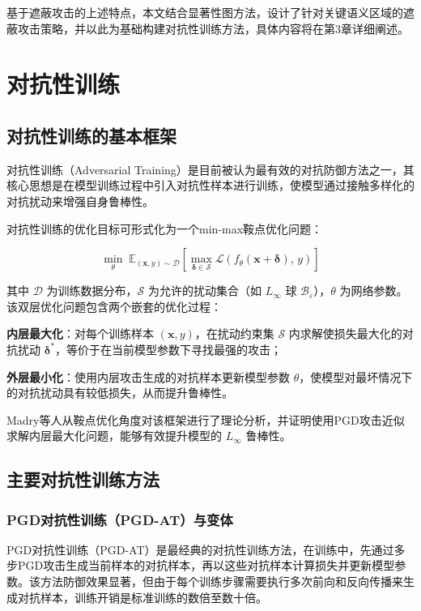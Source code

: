 基于遮蔽攻击的上述特点，本文结合显著性图方法，设计了针对关键语义区域的遮蔽攻击策略，并以此为基础构建对抗性训练方法，具体内容将在第3章详细阐述。

\section{对抗性训练}

\subsection{对抗性训练的基本框架}

对抗性训练（Adversarial Training）是目前被认为最有效的对抗防御方法之一，其核心思想是在模型训练过程中引入对抗性样本进行训练，使模型通过接触多样化的对抗扰动来增强自身鲁棒性。

对抗性训练的优化目标可形式化为一个min-max鞍点优化问题\cite{madry2018pgd}：

\begin{equation}
  \min_{\theta} \; \mathbb{E}_{(\mathbf{x}, y) \sim \mathcal{D}} \left[ \max_{\boldsymbol{\delta} \in \mathcal{S}} \mathcal{L}(f_\theta(\mathbf{x} + \boldsymbol{\delta}),\, y) \right]
\end{equation}

其中 $\mathcal{D}$ 为训练数据分布，$\mathcal{S}$ 为允许的扰动集合（如 $L_\infty$ 球 $\mathcal{B}_\varepsilon$），$\theta$ 为网络参数。该双层优化问题包含两个嵌套的优化过程：

\textbf{内层最大化}：对每个训练样本 $(\mathbf{x}, y)$，在扰动约束集 $\mathcal{S}$ 内求解使损失最大化的对抗扰动 $\boldsymbol{\delta}^*$，等价于在当前模型参数下寻找最强的攻击；

\textbf{外层最小化}：使用内层攻击生成的对抗样本更新模型参数 $\theta$，使模型对最坏情况下的对抗扰动具有较低损失，从而提升鲁棒性。

Madry等人从鞍点优化角度对该框架进行了理论分析，并证明使用PGD攻击近似求解内层最大化问题，能够有效提升模型的 $L_\infty$ 鲁棒性\cite{madry2018pgd}。

\subsection{主要对抗性训练方法}

\subsubsection*{PGD对抗性训练（PGD-AT）与变体}

PGD对抗性训练（PGD-AT）是最经典的对抗性训练方法，在训练中，先通过多步PGD攻击生成当前样本的对抗样本，再以这些对抗样本计算损失并更新模型参数。该方法防御效果显著，但由于每个训练步骤需要执行多次前向和反向传播来生成对抗样本，训练开销是标准训练的数倍至数十倍。

